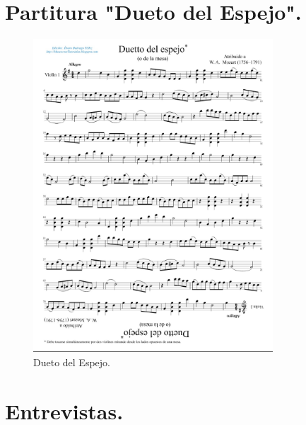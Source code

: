 \documentclass[a4paper, openright, 11pt, titlepage]{report}
\theoremstyle{definition}\newtheorem{defin}[propo]{Definition}
\theoremstyle{definition}\newtheorem{obser}[propo]{Remark}
\theoremstyle{definition}\newtheorem{ejem}[propo]{Ejemplo}
\theoremstyle{definition}\newtheorem{algoritmo}[propo]{Algoritmo}
\begin{document}
\chapter{Partitura "Dueto del Espejo".}
\begin{figure}[H]
    \centering
    \includegraphics[width = 0.8\textwidth]{Images/Apéndices/Apéndice C/duettoMozart.png}
    \caption{Dueto del Espejo.}
    \label{fig:my_label}
\end{figure}
\chapter{Entrevistas.}
\end{document}
